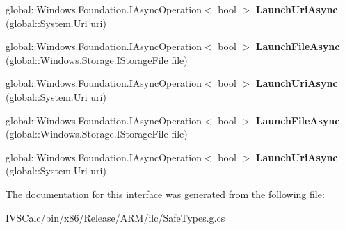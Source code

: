 \begin{DoxyCompactItemize}
\item 
\mbox{\label{interface_windows_1_1_system_1_1_i_launcher_statics_afacaac47075c49eb66661fc380ca1b73}} 
global\+::\+Windows.\+Foundation.\+I\+Async\+Operation$<$ bool $>$ {\bfseries Launch\+Uri\+Async} (global\+::\+System.\+Uri uri)
\item 
\mbox{\label{interface_windows_1_1_system_1_1_i_launcher_statics_aa8dfdac184d6ee1fc0220fbcdcc541ab}} 
global\+::\+Windows.\+Foundation.\+I\+Async\+Operation$<$ bool $>$ {\bfseries Launch\+File\+Async} (global\+::\+Windows.\+Storage.\+I\+Storage\+File file)
\item 
\mbox{\label{interface_windows_1_1_system_1_1_i_launcher_statics_afacaac47075c49eb66661fc380ca1b73}} 
global\+::\+Windows.\+Foundation.\+I\+Async\+Operation$<$ bool $>$ {\bfseries Launch\+Uri\+Async} (global\+::\+System.\+Uri uri)
\item 
\mbox{\label{interface_windows_1_1_system_1_1_i_launcher_statics_aa8dfdac184d6ee1fc0220fbcdcc541ab}} 
global\+::\+Windows.\+Foundation.\+I\+Async\+Operation$<$ bool $>$ {\bfseries Launch\+File\+Async} (global\+::\+Windows.\+Storage.\+I\+Storage\+File file)
\item 
\mbox{\label{interface_windows_1_1_system_1_1_i_launcher_statics_afacaac47075c49eb66661fc380ca1b73}} 
global\+::\+Windows.\+Foundation.\+I\+Async\+Operation$<$ bool $>$ {\bfseries Launch\+Uri\+Async} (global\+::\+System.\+Uri uri)
\end{DoxyCompactItemize}


The documentation for this interface was generated from the following file\+:\begin{DoxyCompactItemize}
\item 
I\+V\+S\+Calc/bin/x86/\+Release/\+A\+R\+M/ilc/Safe\+Types.\+g.\+cs\end{DoxyCompactItemize}
